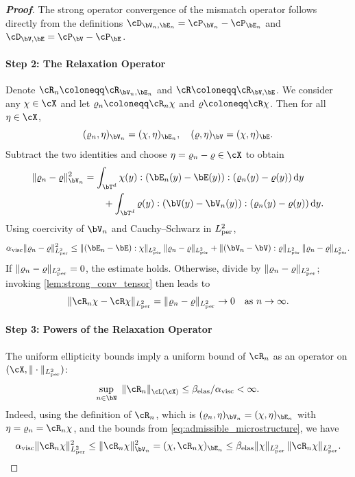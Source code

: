 \begin{proof}[\bf Proof]
The strong operator convergence of the mismatch operator follows directly from the definitions $\cD_{\bV_n,\bE_n} = \cP_{\bV_n}-\cP_{\bE_n}$ and $\cD_{\bV,\bE} = \cP_{\bV}-\cP_{\bE}$.

\paragraph{Step 2: The Relaxation Operator}
Denote $\cR_n\coloneqq \cR_{\bV_n,\bE_n}$ and $\cR\coloneqq \cR_{\bV,\bE}$. We consider any $\chi\in\cX$ and let $\varrho_n\coloneqq\cR_n\chi$ and $\varrho\coloneqq\cR\chi$. Then for all $\eta\in\cX$,
\begin{equation*}
(\varrho_n,\eta)_{\bV_n}=(\chi,\eta)_{\bE_n},
\quad
(\varrho,\eta)_{\bV}=(\chi,\eta)_{\bE}.
\end{equation*}
Subtract the two identities and choose $\eta=\varrho_n-\varrho\in\cX$ to obtain
\begin{align*}
\|\varrho_n-\varrho\|_{\bV_n}^2
&= \int_{\bT^d} \chi(y):(\bE_n(y)-\bE(y)):(\varrho_n(y)-\varrho(y))\,\mathrm{d}y\\
    &\qquad+ \int_{\bT^d} \varrho(y):(\bV(y)-\bV_n(y)):(\varrho_n(y)-\varrho(y))\,\mathrm{d}y.
\end{align*}
Using coercivity of $\bV_n$ and Cauchy--Schwarz in $L^2_{\rm per}$,
\begin{equation*}
\alpha_{\rm visc}\|\varrho_n-\varrho\|_{L^2_{\rm per}}^2
\leq \|(\bE_n-\bE):\chi\|_{L^2_{\rm per}}\,\|\varrho_n-\varrho\|_{L^2_{\rm per}}
    + \|(\bV_n-\bV):\varrho\|_{L^2_{\rm per}}\,\|\varrho_n-\varrho\|_{L^2_{\rm per}}.
\end{equation*}
If $\|\varrho_n-\varrho\|_{L^2_{\rm per}}=0$, the estimate holds. Otherwise, divide by $\|\varrho_n-\varrho\|_{L^2_{\rm per}}$; invoking \cref{lem:strong_conv_tensor} then leads to
\begin{equation}\label{eq:R_strong}
\|\cR_n\chi-\cR\chi\|_{L^2_{\rm per}} = \|\varrho_n-\varrho\|_{L^2_{\rm per}} \to 0 \quad \text{as } n \to \infty.
\end{equation}

\paragraph{Step 3: Powers of the Relaxation Operator}
The uniform ellipticity bounds imply a uniform bound of $\cR_n$ as an operator on $(\cX,\|\cdot\|_{L^2_{\rm per}})$:
\begin{equation}\label{eq:R_uniform_bound}
\sup_{n\in\bN}\ \|\cR_n\|_{\cL(\cX)} \le \beta_{\rm elas}/\alpha_{\rm visc}<\infty.
\end{equation}
Indeed, using the definition of $\cR_n$, which is $(\varrho_n,\eta)_{\bV_n}=(\chi,\eta)_{\bE_n}$ with $\eta=\varrho_n=\cR_n\chi$, and the bounds from \cref{eq:admissible_microstructure}, we have
\begin{equation*}
\alpha_{\rm visc}\|\cR_n\chi\|_{L^2_{\rm per}}^2\le \|\cR_n\chi\|_{\bV_n}^2
=(\chi,\cR_n\chi)_{\bE_n}
\le \beta_{\rm elas}\|\chi\|_{L^2_{\rm per}}\,\|\cR_n\chi\|_{L^2_{\rm per}}.
\end{equation*}


\end{proof}

